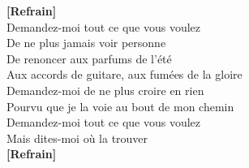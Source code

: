 \documentclass{novel}
\begin{document}
{\begin{minipage}[t][0.5\textheight][t]{\textwidth}
\begin{multicols}{2}
\textbf{[Refrain]}\\

Demandez-moi tout ce que vous voulez \\
De ne plus jamais voir personne \\
De renoncer aux parfums de l'été \\
Aux accords de guitare, aux fumées de la gloire \\
Demandez-moi de ne plus croire en rien \\
Pourvu que je la voie au bout de mon chemin \\
Demandez-moi tout ce que vous voulez \\
Mais dites-moi où la trouver \\

\textbf{[Refrain]}\\

\end{multicols}
\end{minipage}
}

\newpage
\normalsize
\end{document}

